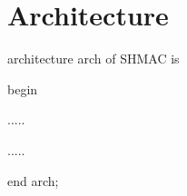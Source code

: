 \chapter{Architecture}
\label{cha:architecture}

architecture arch of SHMAC is

begin

.....

.....

end arch;